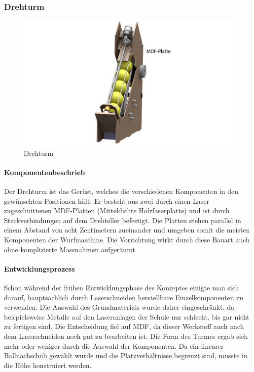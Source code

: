 \subsubsection{Drehturm}
\begin{figure}[h!]
	\centering
	\includegraphics[width=\linewidth]{../../fig/Render-Drehturmx}
	\caption{Drehturm}
	\label{fig:Drehturm}
\end{figure}

\paragraph{Komponentenbeschrieb\\}
Der Drehturm ist das Gerüst, welches die verschiedenen Komponenten in den gewünschten Positionen hält. Er besteht aus zwei durch einen Laser zugeschnittenen MDF-Platten (Mitteldichte Holzfaserplatte) und ist durch Steckverbindungen auf dem Drehteller befestigt. Die Platten stehen parallel in einem Abstand von acht Zentimetern zueinander und umgeben somit die meisten Komponenten der Wurfmaschine. Die Vorrichtung wirkt durch diese Bauart auch ohne komplizierte Massnahmen aufgeräumt.

\paragraph{Entwicklungsprozess\\}
Schon während der frühen Entwicklungsphase des Konzeptes einigte man sich darauf, hauptsächlich durch Laserschneiden herstellbare Einzelkomponenten zu verwenden. Die Auswahl des Grundmaterials wurde daher eingeschränkt, da beispielsweise Metalle auf den Laseranlagen der Schule nur schlecht, bis gar nicht zu fertigen sind. Die Entscheidung fiel auf MDF, da dieser Werkstoff auch nach dem Laserschneiden noch gut zu bearbeiten ist. Die Form des Turmes ergab sich mehr oder weniger durch die Auswahl der Komponenten. Da ein linearer Ballnachschub gewählt wurde und die Platzverhältnisse begrenzt sind, musste in die Höhe konstruiert werden.